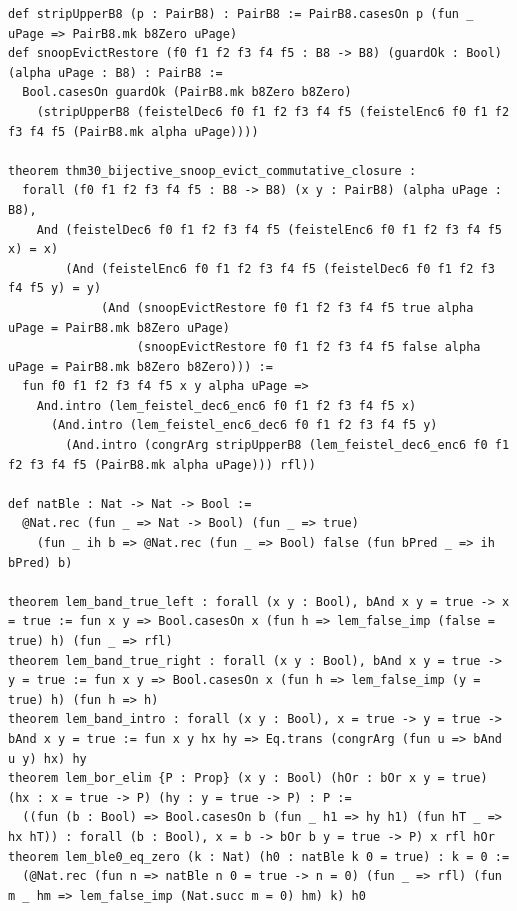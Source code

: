 \documentclass[11pt,letterpaper]{article}
\theoremstyle{spectralthm}
\begin{document}
\begin{lstlisting}[language=Lean4,caption={Standalone Pure Init.Prelude Term-Mode Lean 4 Kernel Suite (thm30--thm61, v0.0.0, 0 sorry, 0 axioms).},label={lst:lean_unified}]
def stripUpperB8 (p : PairB8) : PairB8 := PairB8.casesOn p (fun _ uPage => PairB8.mk b8Zero uPage)
def snoopEvictRestore (f0 f1 f2 f3 f4 f5 : B8 -> B8) (guardOk : Bool) (alpha uPage : B8) : PairB8 :=
  Bool.casesOn guardOk (PairB8.mk b8Zero b8Zero)
    (stripUpperB8 (feistelDec6 f0 f1 f2 f3 f4 f5 (feistelEnc6 f0 f1 f2 f3 f4 f5 (PairB8.mk alpha uPage))))

theorem thm30_bijective_snoop_evict_commutative_closure :
  forall (f0 f1 f2 f3 f4 f5 : B8 -> B8) (x y : PairB8) (alpha uPage : B8),
    And (feistelDec6 f0 f1 f2 f3 f4 f5 (feistelEnc6 f0 f1 f2 f3 f4 f5 x) = x)
        (And (feistelEnc6 f0 f1 f2 f3 f4 f5 (feistelDec6 f0 f1 f2 f3 f4 f5 y) = y)
             (And (snoopEvictRestore f0 f1 f2 f3 f4 f5 true alpha uPage = PairB8.mk b8Zero uPage)
                  (snoopEvictRestore f0 f1 f2 f3 f4 f5 false alpha uPage = PairB8.mk b8Zero b8Zero))) :=
  fun f0 f1 f2 f3 f4 f5 x y alpha uPage =>
    And.intro (lem_feistel_dec6_enc6 f0 f1 f2 f3 f4 f5 x)
      (And.intro (lem_feistel_enc6_dec6 f0 f1 f2 f3 f4 f5 y)
        (And.intro (congrArg stripUpperB8 (lem_feistel_dec6_enc6 f0 f1 f2 f3 f4 f5 (PairB8.mk alpha uPage))) rfl))

def natBle : Nat -> Nat -> Bool :=
  @Nat.rec (fun _ => Nat -> Bool) (fun _ => true)
    (fun _ ih b => @Nat.rec (fun _ => Bool) false (fun bPred _ => ih bPred) b)

theorem lem_band_true_left : forall (x y : Bool), bAnd x y = true -> x = true := fun x y => Bool.casesOn x (fun h => lem_false_imp (false = true) h) (fun _ => rfl)
theorem lem_band_true_right : forall (x y : Bool), bAnd x y = true -> y = true := fun x y => Bool.casesOn x (fun h => lem_false_imp (y = true) h) (fun h => h)
theorem lem_band_intro : forall (x y : Bool), x = true -> y = true -> bAnd x y = true := fun x y hx hy => Eq.trans (congrArg (fun u => bAnd u y) hx) hy
theorem lem_bor_elim {P : Prop} (x y : Bool) (hOr : bOr x y = true) (hx : x = true -> P) (hy : y = true -> P) : P :=
  ((fun (b : Bool) => Bool.casesOn b (fun _ h1 => hy h1) (fun hT _ => hx hT)) : forall (b : Bool), x = b -> bOr b y = true -> P) x rfl hOr
theorem lem_ble0_eq_zero (k : Nat) (h0 : natBle k 0 = true) : k = 0 :=
  (@Nat.rec (fun n => natBle n 0 = true -> n = 0) (fun _ => rfl) (fun m _ hm => lem_false_imp (Nat.succ m = 0) hm) k) h0


\end{lstlisting}
\end{document}
